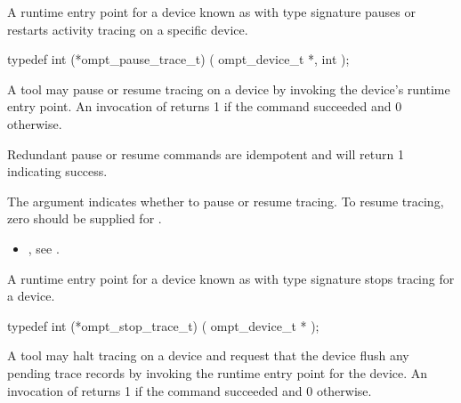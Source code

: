 \label{sec:ompt_pause_trace_t}

\summary
A runtime entry point for a device known as 
with type signature 
pauses or restarts activity tracing on a specific device.

\begin{ccppspecific}
\begin{omptInquiry}
typedef int (*ompt_pause_trace_t) (
  ompt_device_t *,
  int 
);
\end{omptInquiry}
\end{ccppspecific}

\descr

A tool may pause or resume tracing on a device by invoking the device's
 runtime entry point.
An invocation of  returns 1 if the command
succeeded and 0 otherwise.

Redundant pause or resume commands are idempotent and will
return 1 indicating success.

\argdesc

\devicedesc

The argument  indicates whether to pause or
resume tracing.
To resume tracing, zero should be supplied for .


\crossreferences
\begin{itemize}
\item {},
see .
\end{itemize}

\label{sec:ompt_stop_trace_t}

\summary
A runtime entry point for a device known as 
with type signature 
stops tracing for a device.

\begin{ccppspecific}
\begin{omptInquiry}
typedef int (*ompt_stop_trace_t) (
  ompt_device_t *
);
\end{omptInquiry}
\end{ccppspecific}

\descr

A tool may halt tracing on a device and request that the device flush any pending trace records
by invoking the  runtime entry point for the device.
An invocation of  returns 1 if the command
succeeded and 0 otherwise.

